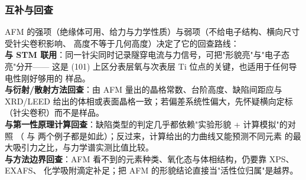 \subsubsection{互补与回查}
\label{sec:afm-crosscheck}

\begin{crosscheck}
AFM 的强项（绝缘体可用、给力与力学性质）与弱项（不给电子结构、横向尺寸受针尖卷积影响、
高度不等于几何高度）决定了它的回查路线：\\
\textbf{与 STM 联用}：同一针尖同时记录隧穿电流与力信号，可把"形貌亮"与"电子态亮"分开——
这是 (101) 上区分表层氧与次表层 Ti 位点的关键，也适用于任何导电性刚好够用的
样品。\\
\textbf{与衍射/散射方法回查}：由 AFM 量出的晶格常数、台阶高度、缺陷间距应与 XRD/LEED
给出的体相或表面晶格一致；若偏差系统性偏大，先怀疑横向定标（针尖卷积）而不是样品。\\
\textbf{与第一性原理计算回查}：缺陷类型的判定几乎都依赖"实验形貌 + 计算模拟"的对照
（ 与  两个例子都是如此）；反过来，计算给出的力曲线又能预测不同元素
的最大吸引力之比，与力学谱实测比值比较。\\
\textbf{与方法边界回查}：AFM 看不到的元素种类、氧化态与体相结构，仍要靠 XPS、EXAFS、
化学吸附滴定补足；把 AFM 的形貌结论直接当"活性位归属"是越界。
\end{crosscheck}


